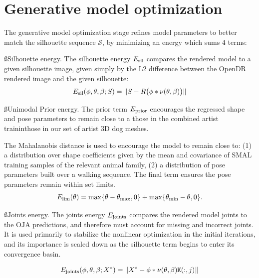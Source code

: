 \section{Generative model optimization}
The generative model optimization stage refines model parameters to better match the silhouette sequence $\mathcal S$, by minimizing an energy which sums 4 terms:

\ss{Silhouette energy.}
The silhouette energy ${E_{\text{sil}}}$ compares the rendered model to a given silhouette image, given simply by the L2 difference between the OpenDR rendered image and the given silhouette:
\begin{equation}
{E_{\text{sil}}}(\phi, \theta, \beta; S) = \lVert S - R\bigl(\phi * \nu(\theta, \beta)\bigr) \rVert
\end{equation}

\ss{Unimodal Prior energy.}
The prior term ${E_{\text{prior}}}$ encourages the regressed shape and pose parameters to remain close to a those in the combined artist traininthose in our set of artist 3D dog meshes.



The Mahalanobis distance is used to encourage the model to remain close to: (1) a distribution over shape coefficients given by the mean and covariance of SMAL training samples of the relevant animal family, (2) a distribution of pose parameters built over a walking sequence. The final term ensures the pose parameters remain within set limits.
\begin{equation}
{E_{\text{lim}}}(\theta) = \max\{\theta - \theta_{\text{max}}, 0\} + \max\{\theta_{\text{min}} - \theta, 0\}.
\end{equation}

\ss{Joints energy.}
The joints energy ${E_{\text{joints}}}$ compares the rendered model joints to the OJA predictions, and therefore must account for missing and incorrect joints.  It is used primarily to stabilize the nonlinear optimization in the initial iterations, and its importance is scaled down as the silhouette term begins to enter its convergence basin.

\begin{equation}
{E_{\text{joints}}}(\phi, \theta, \beta; X^{*}) = 
\lVert X^{*} - \phi * \nu(\theta,\beta)\mathtt{K}(:,j) \rVert
\end{equation}

